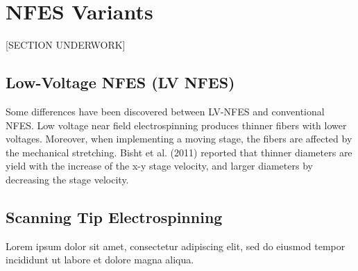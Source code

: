 \documentclass[5p,,preprint,12pt,twocolumn]{elsarticle}
\def\tblbottomrule{\noalign{\vspace*{6pt}}\hline\noalign{\vspace*{2pt}}}
\begin{document}
\begin{landscape}
\endgroup
\makeatletter{}\makeatother 
\end{landscape}

    
\section{NFES Variants}
[SECTION UNDERWORK]



\subsection{Low-Voltage NFES (LV NFES) \unskip~\protect\cite{527120:11973130}}Some differences have been discovered between LV-NFES and conventional NFES. Low voltage near field electrospinning produces thinner fibers with lower voltages. Moreover, when implementing a moving stage, the fibers are affected by the mechanical stretching. Bisht et al. (2011) reported that thinner diameters are yield with the increase of the x-y stage velocity, and larger diameters by decreasing the stage velocity.



\subsection{Scanning Tip Electrospinning \unskip~\protect\cite{527120:11974306}}Lorem ipsum dolor sit amet, consectetur adipiscing elit, sed do eiusmod tempor incididunt ut labore et dolore magna aliqua.
\end{document}
